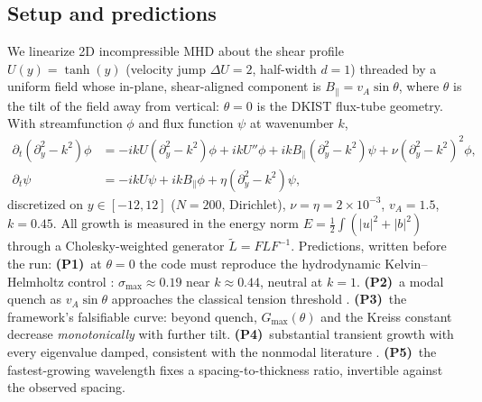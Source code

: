 \documentclass[11pt]{article}
\theoremstyle{definition}
\theoremstyle{remark}
\begin{document}
\subsection{Setup and predictions}
We linearize 2D incompressible MHD about the shear profile $U(y)=\tanh(y)$
(velocity jump $\Delta U=2$, half-width $d=1$) threaded by a uniform field
whose in-plane, shear-aligned component is $B_\parallel = v_A\sin\theta$,
where $\theta$ is the tilt of the field away from vertical: $\theta=0$ is
the DKIST flux-tube geometry. With streamfunction $\phi$ and flux function
$\psi$ at wavenumber $k$,
\begin{align}
\partial_t(\partial_y^2-k^2)\phi &= -ikU(\partial_y^2-k^2)\phi
+ ikU''\phi + ikB_\parallel(\partial_y^2-k^2)\psi + \nu(\partial_y^2-k^2)^2\phi,\\
\partial_t\psi &= -ikU\psi + ikB_\parallel\phi + \eta(\partial_y^2-k^2)\psi,
\end{align}
discretized on $y\in[-12,12]$ ($N=200$, Dirichlet), $\nu=\eta=2\times10^{-3}$,
$v_A=1.5$, $k=0.45$. All growth is measured in the energy norm
$E=\tfrac12\int(|u|^2+|b|^2)$ through a Cholesky-weighted generator
$\tilde L = F L F^{-1}$. Predictions, written before the run:
\textbf{(P1)}~at $\theta=0$ the code must reproduce the hydrodynamic
Kelvin--Helmholtz control \cite{michalke}: $\sigma_{\max}\approx0.19$ near
$k\approx0.44$, neutral at $k=1$. \textbf{(P2)}~a modal quench as
$v_A\sin\theta$ approaches the classical tension threshold
\cite{chandra,keppens,obergaulinger}. \textbf{(P3)}~the framework's
falsifiable curve: beyond quench, $G_{\max}(\theta)$ and the Kreiss constant
decrease \emph{monotonically} with further tilt. \textbf{(P4)}~substantial
transient growth with every eigenvalue damped, consistent with the nonmodal
literature \cite{fraser}. \textbf{(P5)}~the fastest-growing wavelength fixes
a spacing-to-thickness ratio, invertible against the observed spacing.
\end{document}
